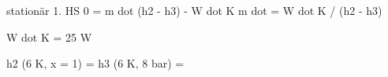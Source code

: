 stationär 1. HS  
0 = m dot (h2 - h3) - W dot K  
m dot = W dot K / (h2 - h3)  

W dot K = 25 W  

h2 (6 K, x = 1) =  
h3 (6 K, 8 bar) =
